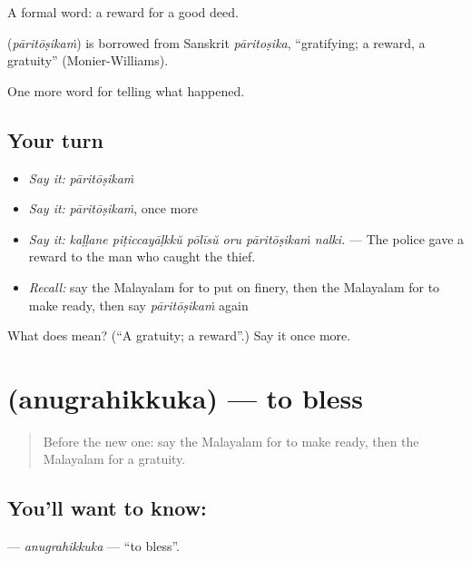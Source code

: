 A formal word: a reward for a good deed.

\begin{cousinweb}
\textbf{} (\emph{pāritōṣikaṁ}) is borrowed from Sanskrit \emph{pāritoṣika}, \textquotedblleft{}gratifying; a reward, a gratuity\textquotedblright{} (Monier-Williams).
\end{cousinweb}

\begin{grammarlens}[title={What you've built}]
One more word for telling what happened.
\end{grammarlens}

\subsection*{Your turn}
\begin{itemize}
\raggedright
  \item \emph{Say it:} \emph{pāritōṣikaṁ}
  \item \emph{Say it:} \emph{pāritōṣikaṁ}, once more
  \item \emph{Say it:} \emph{kaḷḷane piṭiccayāḷkkŭ pōlīsŭ oru pāritōṣikaṁ nalki.} — The police gave a reward to the man who caught the thief.
  \item \emph{Recall:} say the Malayalam for to put on finery, then the Malayalam for to make ready, then say \emph{pāritōṣikaṁ} again
\end{itemize}

\begin{tcolorbox}[breakable,colback=teal!4,colframe=teal!35!black,title={Before you move on}]
What does  mean? (\textquotedblleft{}A gratuity; a reward\textquotedblright{}.) Say it once more.
\end{tcolorbox}
\section[\texorpdfstring{\ml{അനുഗ്രഹിക്കുക} (anugrahikkuka)}{അനുഗ്രഹിക്കുക (anugrahikkuka)}]{ (anugrahikkuka) — to bless}

\label{lesson:ML-C388-anugrahikkuka}



\begin{quote}
Before the new one: say the Malayalam for to make ready, then the Malayalam for a gratuity.
\end{quote}

\subsection*{You'll want to know: }
\textbf{} — \emph{anugrahikkuka} — \textquotedblleft{}to bless\textquotedblright{}.

